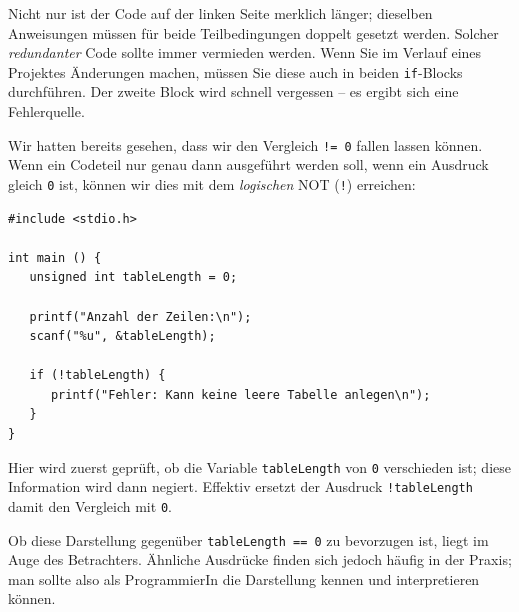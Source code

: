 Nicht nur ist der Code auf der linken Seite merklich länger; dieselben Anweisungen müssen für beide Teilbedingungen doppelt gesetzt werden. Solcher \emph{redundanter} Code sollte immer vermieden werden. Wenn Sie im Verlauf eines Projektes Änderungen machen, müssen Sie diese auch in beiden \texttt{if}-Blocks durchführen. Der zweite Block wird schnell vergessen -- es ergibt sich eine Fehlerquelle.

\begin{hintbox}
Wir hatten bereits gesehen, dass wir den Vergleich \texttt{!= 0} fallen lassen können. Wenn ein Codeteil nur genau dann ausgeführt werden soll, wenn ein Ausdruck gleich \texttt{0} ist, können wir dies mit dem \emph{logischen} NOT (\texttt{!}) erreichen:

\begin{codebox}
\begin{verbatim}
#include <stdio.h>

int main () {
   unsigned int tableLength = 0;

   printf("Anzahl der Zeilen:\n");
   scanf("%u", &tableLength);

   if (!tableLength) {
      printf("Fehler: Kann keine leere Tabelle anlegen\n");
   }
}
\end{verbatim}
\end{codebox}

Hier wird zuerst geprüft, ob die Variable \texttt{tableLength} von \texttt{0} verschieden ist; diese Information wird dann negiert. Effektiv ersetzt der Ausdruck \texttt{!tableLength} damit den Vergleich mit \texttt{0}.

Ob diese Darstellung gegenüber \texttt{tableLength == 0} zu bevorzugen ist, liegt im Auge des Betrachters. Ähnliche Ausdrücke finden sich jedoch häufig in der Praxis; man sollte also als ProgrammierIn die Darstellung kennen und interpretieren können.
\end{hintbox}

